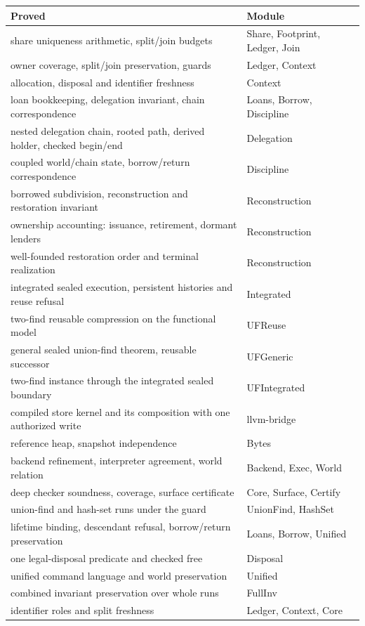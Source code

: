 \documentclass[10pt,a4paper]{article}
\begin{document}
\begin{center}
\begin{tabular}{@{}p{}p{}@{}}
\toprule
Proved & Module \\
\midrule
share uniqueness arithmetic, split/join budgets & Share, Footprint, Ledger, Join \\
owner coverage, split/join preservation, guards & Ledger, Context \\
allocation, disposal and identifier freshness & Context \\
loan bookkeeping, delegation invariant, chain correspondence & Loans, Borrow, Discipline \\
nested delegation chain, rooted path, derived holder, checked begin/end & Delegation \\
coupled world/chain state, borrow/return correspondence & Discipline \\
borrowed subdivision, reconstruction and restoration invariant & Reconstruction \\
ownership accounting: issuance, retirement, dormant lenders & Reconstruction \\
well-founded restoration order and terminal realization & Reconstruction \\
integrated sealed execution, persistent histories and reuse refusal & Integrated \\
two-find reusable compression on the functional model & UFReuse \\
general sealed union-find theorem, reusable successor & UFGeneric \\
two-find instance through the integrated sealed boundary & UFIntegrated \\
compiled store kernel and its composition with one authorized write & llvm-bridge \\
reference heap, snapshot independence & Bytes \\
backend refinement, interpreter agreement, world relation & Backend, Exec, World \\
deep checker soundness, coverage, surface certificate & Core, Surface, Certify \\
union-find and hash-set runs under the guard & UnionFind, HashSet \\
lifetime binding, descendant refusal, borrow/return preservation & Loans, Borrow, Unified \\
one legal-disposal predicate and checked free & Disposal \\
unified command language and world preservation & Unified \\
combined invariant preservation over whole runs & FullInv \\
identifier roles and split freshness & Ledger, Context, Core \\
\bottomrule
\end{tabular}
\end{center}
\end{document}
